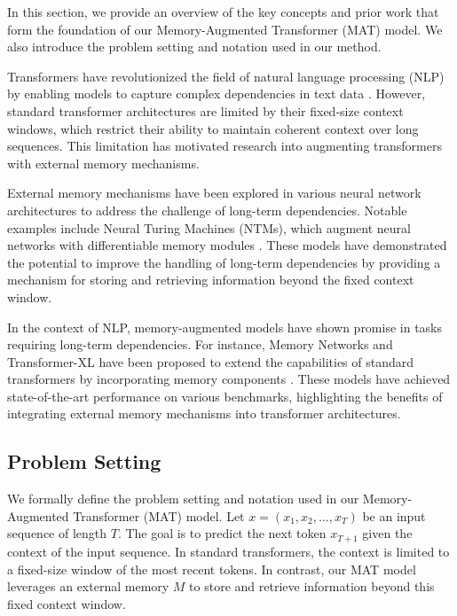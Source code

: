 \documentclass{article} %
\begin{document}
In this section, we provide an overview of the key concepts and prior work that form the foundation of our Memory-Augmented Transformer (MAT) model. We also introduce the problem setting and notation used in our method.

Transformers have revolutionized the field of natural language processing (NLP) by enabling models to capture complex dependencies in text data \citep{vaswani2017attention}. However, standard transformer architectures are limited by their fixed-size context windows, which restrict their ability to maintain coherent context over long sequences. This limitation has motivated research into augmenting transformers with external memory mechanisms.

External memory mechanisms have been explored in various neural network architectures to address the challenge of long-term dependencies. Notable examples include Neural Turing Machines (NTMs), which augment neural networks with differentiable memory modules \citep{Graves2014NeuralTM}. These models have demonstrated the potential to improve the handling of long-term dependencies by providing a mechanism for storing and retrieving information beyond the fixed context window.

In the context of NLP, memory-augmented models have shown promise in tasks requiring long-term dependencies. For instance, Memory Networks and Transformer-XL have been proposed to extend the capabilities of standard transformers by incorporating memory components \citep{Henaff2016TrackingTW, Dai2019TransformerXLAL}. These models have achieved state-of-the-art performance on various benchmarks, highlighting the benefits of integrating external memory mechanisms into transformer architectures.

\subsection{Problem Setting}
\label{sec:problem_setting}

We formally define the problem setting and notation used in our Memory-Augmented Transformer (MAT) model. Let \( x = (x_1, x_2, \ldots, x_T) \) be an input sequence of length \( T \). The goal is to predict the next token \( x_{T+1} \) given the context of the input sequence. In standard transformers, the context is limited to a fixed-size window of the most recent tokens. In contrast, our MAT model leverages an external memory \( M \) to store and retrieve information beyond this fixed context window.
\end{document}
